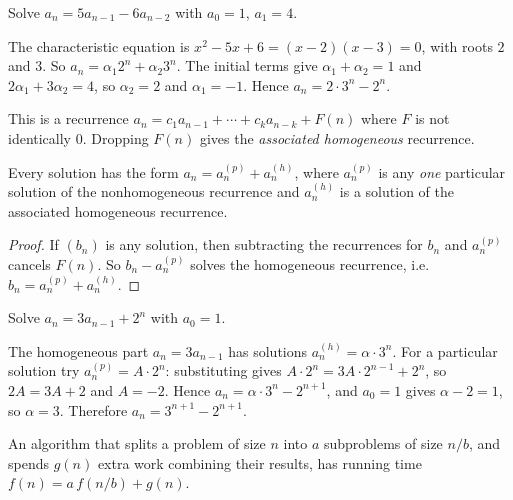 \begin{example}
Solve $a_n = 5a_{n-1} - 6a_{n-2}$ with $a_0=1$, $a_1=4$.

The characteristic equation is $x^2-5x+6=(x-2)(x-3)=0$, with roots $2$ and $3$. So $a_n = \alpha_1 2^n + \alpha_2 3^n$. The initial terms give $\alpha_1+\alpha_2=1$ and $2\alpha_1+3\alpha_2=4$, so $\alpha_2=2$ and $\alpha_1=-1$. Hence $a_n = 2\cdot3^n-2^n$.
\end{example}

\bigskip
\begin{definition}
This is a recurrence $a_n = c_1a_{n-1}+\cdots+c_ka_{n-k} + F(n)$ where $F$ is not identically $0$. Dropping $F(n)$ gives the \emph{associated homogeneous} recurrence.
\end{definition}

\begin{proposition}
Every solution has the form $a_n = a_n^{(p)} + a_n^{(h)}$, where $a_n^{(p)}$ is any \emph{one} particular solution of the nonhomogeneous recurrence and $a_n^{(h)}$ is a solution of the associated homogeneous recurrence.
\end{proposition}
\begin{proof}
If $(b_n)$ is any solution, then subtracting the recurrences for $b_n$ and $a_n^{(p)}$ cancels $F(n)$. So $b_n-a_n^{(p)}$ solves the homogeneous recurrence, i.e.\ $b_n=a_n^{(p)}+a_n^{(h)}$.
\end{proof}

\begin{example}
Solve $a_n = 3a_{n-1}+2^n$ with $a_0=1$.

The homogeneous part $a_n=3a_{n-1}$ has solutions $a_n^{(h)}=\alpha\cdot3^n$. For a particular solution try $a_n^{(p)}=A\cdot2^n$: substituting gives $A\cdot2^n = 3A\cdot2^{n-1}+2^n$, so $2A=3A+2$ and $A=-2$. Hence $a_n = \alpha\cdot3^n - 2^{n+1}$, and $a_0=1$ gives $\alpha-2=1$, so $\alpha=3$. Therefore $a_n = 3^{n+1}-2^{n+1}$.
\end{example}

\bigskip
\begin{definition}
An algorithm that splits a problem of size $n$ into $a$ subproblems of size $n/b$, and spends $g(n)$ extra work combining their results, has running time $f(n) = a\,f(n/b) + g(n)$.
\end{definition}

